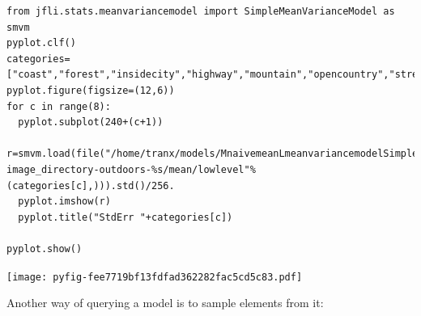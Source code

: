 \documentclass{report}
\begin{document}
\begin{lstlisting}
from jfli.stats.meanvariancemodel import SimpleMeanVarianceModel as smvm
pyplot.clf()
categories=["coast","forest","insidecity","highway","mountain","opencountry","street","tallbuilding"]
pyplot.figure(figsize=(12,6))
for c in range(8):
  pyplot.subplot(240+(c+1))
  r=smvm.load(file("/home/tranx/models/MnaivemeanLmeanvariancemodelSimpleMeanVarianceModel-image_directory-outdoors-%s/mean/lowlevel"%(categories[c],))).std()/256.
  pyplot.imshow(r)
  pyplot.title("StdErr "+categories[c])

pyplot.show()

\end{lstlisting}















\noindent
\texttt{[image: pyfig-fee7719bf13fdfad362282fac5cd5c83.pdf]}






Another way of querying a model is to sample elements from it:
\end{document}
